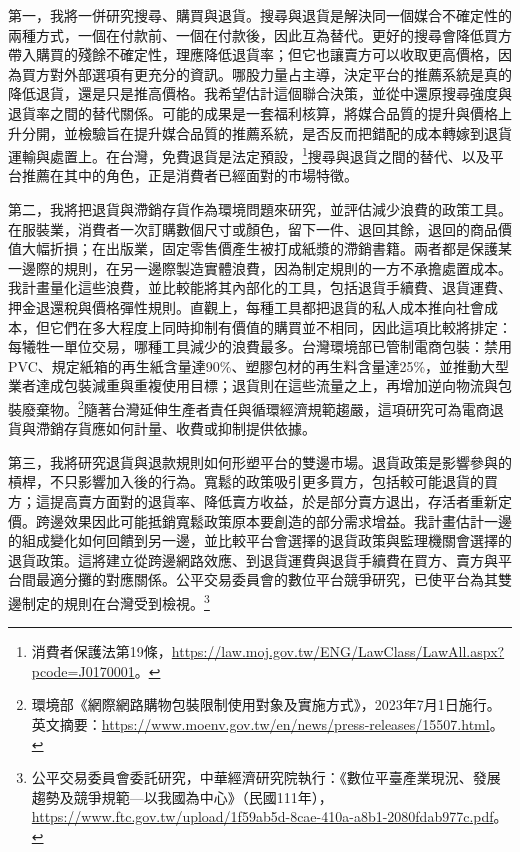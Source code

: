 \documentclass[11pt,letterpaper]{article}
\begin{document}
第一，我將一併研究搜尋、購買與退貨。搜尋與退貨是解決同一個媒合不確定性的兩種方式，一個在付款前、一個在付款後，因此互為替代。更好的搜尋會降低買方帶入購買的殘餘不確定性，理應降低退貨率；但它也讓賣方可以收取更高價格，因為買方對外部選項有更充分的資訊。哪股力量占主導，決定平台的推薦系統是真的降低退貨，還是只是推高價格。我希望估計這個聯合決策，並從中還原搜尋強度與退貨率之間的替代關係。可能的成果是一套福利核算，將媒合品質的提升與價格上升分開，並檢驗旨在提升媒合品質的推薦系統，是否反而把錯配的成本轉嫁到退貨運輸與處置上。在台灣，免費退貨是法定預設，\footnote{消費者保護法第19條，\url{https://law.moj.gov.tw/ENG/LawClass/LawAll.aspx?pcode=J0170001}。}搜尋與退貨之間的替代、以及平台推薦在其中的角色，正是消費者已經面對的市場特徵。

第二，我將把退貨與滯銷存貨作為環境問題來研究，並評估減少浪費的政策工具。在服裝業，消費者一次訂購數個尺寸或顏色，留下一件、退回其餘，退回的商品價值大幅折損；在出版業，固定零售價產生被打成紙漿的滯銷書籍。兩者都是保護某一邊際的規則，在另一邊際製造實體浪費，因為制定規則的一方不承擔處置成本。我計畫量化這些浪費，並比較能將其內部化的工具，包括退貨手續費、退貨運費、押金退還稅與價格彈性規則。直觀上，每種工具都把退貨的私人成本推向社會成本，但它們在多大程度上同時抑制有價值的購買並不相同，因此這項比較將排定：每犧牲一單位交易，哪種工具減少的浪費最多。台灣環境部已管制電商包裝：禁用PVC、規定紙箱的再生紙含量達90\%、塑膠包材的再生料含量達25\%，並推動大型業者達成包裝減重與重複使用目標；退貨則在這些流量之上，再增加逆向物流與包裝廢棄物。\footnote{環境部《網際網路購物包裝限制使用對象及實施方式》，2023年7月1日施行。英文摘要：\url{https://www.moenv.gov.tw/en/news/press-releases/15507.html}。}隨著台灣延伸生產者責任與循環經濟規範趨嚴，這項研究可為電商退貨與滯銷存貨應如何計量、收費或抑制提供依據。

第三，我將研究退貨與退款規則如何形塑平台的雙邊市場。退貨政策是影響參與的槓桿，不只影響加入後的行為。寬鬆的政策吸引更多買方，包括較可能退貨的買方；這提高賣方面對的退貨率、降低賣方收益，於是部分賣方退出，存活者重新定價。跨邊效果因此可能抵銷寬鬆政策原本要創造的部分需求增益。我計畫估計一邊的組成變化如何回饋到另一邊，並比較平台會選擇的退貨政策與監理機關會選擇的退貨政策。這將建立從跨邊網路效應、到退貨運費與退貨手續費在買方、賣方與平台間最適分攤的對應關係。公平交易委員會的數位平台競爭研究，已使平台為其雙邊制定的規則在台灣受到檢視。\footnote{公平交易委員會委託研究，中華經濟研究院執行：《數位平臺產業現況、發展趨勢及競爭規範—以我國為中心》（民國111年），\url{https://www.ftc.gov.tw/upload/1f59ab5d-8cae-410a-a8b1-2080fdab977c.pdf}。}
\end{document}
